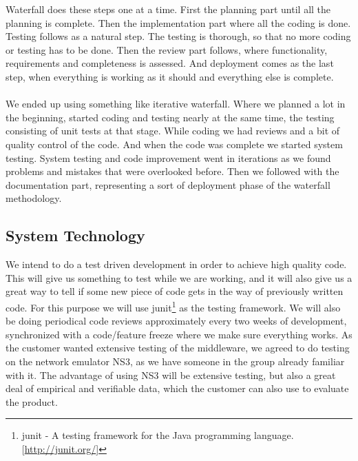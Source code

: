     Waterfall  does these steps one at a time. First the planning part until all the planning is complete. Then the implementation part where all the coding is done. Testing follows as a natural step. The testing is thorough, so that no more coding or testing has to be done. Then the review part follows, where functionality, requirements and completeness is assessed. And deployment comes as the last step, when everything is working as it should and everything else is complete.  
    \\\\
    We ended up using something like iterative waterfall. Where we planned a lot in the beginning, started coding and testing nearly at the same time, the testing consisting of unit tests at that stage. While coding we had reviews and a bit of quality control of the code. And when the code was complete we started system testing. System testing and code improvement went in iterations as we found problems and mistakes that were overlooked before. Then we followed with the documentation part, representing a sort of deployment phase of the waterfall methodology. 

    \subsection{System Technology}\label{System Technology}
    
    We  intend to do a test driven development in order to achieve high quality code. This will give us something to test while we are working, and it will also give us a great way to tell if some new piece of code gets in the way of previously written code. For this purpose we will use \gls{junit}\footnote{\gls{junit} - A testing framework for the Java programming language. [\url{http://junit.org/}]} as the testing framework. We will also be doing periodical code reviews approximately every two weeks of development, synchronized with a code/feature freeze where we make sure everything works. As the customer wanted extensive testing of the middleware, we agreed to do testing on the network emulator NS3, as we have someone in the group already familiar with it. The advantage of using NS3 will be extensive testing, but also a great deal of empirical and verifiable data, which the customer can also use to evaluate the product.

